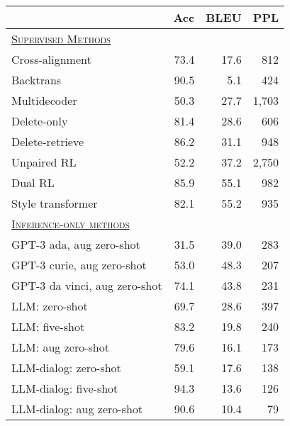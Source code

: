 
\begin{table}[t]
    \setlength{\tabcolsep}{3pt}
    \centering \small 
        \begin{tabular}{l r r r}
        \toprule
         & Acc & BLEU & PPL\\
        \midrule
        \underline{\textsc{Supervised Methods}} \\
        Cross-alignment \citep{NIPS2017_2d2c8394} & 73.4 & 17.6 & 812 \\
        Backtrans \citep{prabhumoye-etal-2018-style} & 90.5 & 5.1 & 424 \\
        Multidecoder \citep{AAAI1817015}  & 50.3 & 27.7 & 1,703\\
        Delete-only \citep{li-etal-2018-delete} & 81.4 & 28.6 & 606 \\
        Delete-retrieve \citep{li-etal-2018-delete} & 86.2 & 31.1 & 948\\
        Unpaired RL \citep{xu-etal-2018-unpaired} & 52.2 & 37.2 & 2,750\\
        Dual RL \citep{DBLP:conf/ijcai/LuoLZYCSS19} & 85.9 & 55.1 & 982\\
        Style transformer \citep{dai-etal-2019-style} & 82.1 & 55.2 & 935\\
        \midrule
        \underline{\textsc{Inference-only methods}} \\
        GPT-3 ada, aug zero-shot& 31.5 & 39.0 & 283\\
        GPT-3 curie, aug zero-shot& 53.0 & 48.3 & 207\\
        GPT-3 da vinci, aug zero-shot& 74.1 & 43.8 & 231\\
        LLM: zero-shot & 69.7 & 28.6 & 397 \\ 
        {\color{white}LLM: }five-shot & 83.2 & 19.8 & 240 \\
        {\color{white}LLM: }aug zero-shot & 79.6 & 16.1 & 173 \\
        LLM-dialog: zero-shot & 59.1 & 17.6 & 138 \\
        {\color{white}LLM-dialog: }five-shot & 94.3 & 13.6 & 126 \\
        {\color{white}LLM-dialog: }aug zero-shot & 90.6 & 10.4 & 79 \\

\end{tabular}
\end{table}
